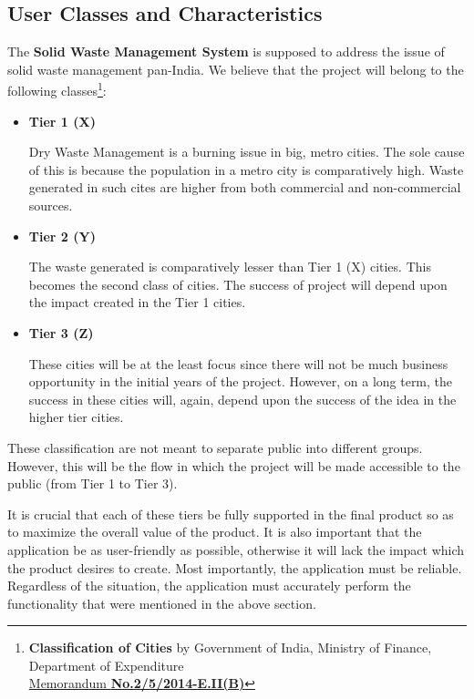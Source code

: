 \documentclass{article}
\begin{document}
\subsection{User Classes and Characteristics}
\par The \textbf{Solid Waste Management System} is supposed to address the issue of solid waste management pan-India. We believe that the project will belong to the following classes\footnote{\textbf{Classification of Cities} by Government of India, Ministry of Finance, Department of Expenditure\\\href{http://www.finmin.nic.in/sites/default/files/21-07-2015_0.pdf}{Memorandum \textbf{No.2/5/2014-E.II(B)}}}:

\begin{itemize}
    \item \textbf{Tier 1 (X)}
    \par Dry Waste Management is a burning issue in big, metro cities. The sole cause of this is because the population in a metro city is comparatively high. Waste generated in such cites are higher from both commercial and non-commercial sources.
    
    \item \textbf{Tier 2 (Y)}
    \par The waste generated is comparatively lesser than Tier 1 (X) cities. This becomes the second class of cities. The success of project will depend upon the impact created in the Tier 1 cities.
    
    \item \textbf{Tier 3 (Z)}
    \par These cities will be at the least focus since there will not be much business opportunity in the initial years of the project. However, on a long term, the success in these cities will, again, depend upon the success of the idea in the higher tier cities.
\end{itemize}
\par These classification are not meant to separate public into different groups. However, this will be the flow in which the project will be made accessible to the public (from Tier 1 to Tier 3). 
\par It  is  crucial  that  each  of  these  tiers  be  fully  supported  in  the  final  product  so  as  to maximize the overall value of the product. It is also important that the application be as user-friendly as possible, otherwise it will lack the impact which the product desires to create. Most importantly, the application must be reliable. Regardless of the situation, the application must accurately perform the functionality that were mentioned in the above section.  
\end{document}
